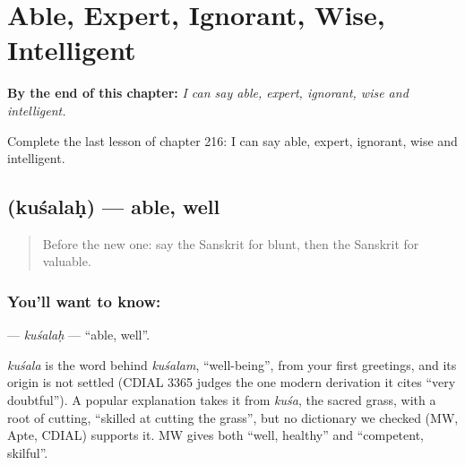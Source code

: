 
\chapter{Able, Expert, Ignorant, Wise, Intelligent}
\label{ch:sa-able-expert-ignorant-wise-intelligent}

\begin{chapteropening}
\textbf{By the end of this chapter:} \emph{I can say able, expert, ignorant, wise and intelligent.}

Complete the last lesson of chapter 216: I can say able, expert, ignorant, wise and intelligent.
\end{chapteropening}

\section[\texorpdfstring{\sk{कुशलः} (kuśalaḥ)}{कुशलः (kuśalaḥ)}]{ (kuśalaḥ) — able, well}

\label{lesson:SA-C216-kusalah}



\begin{quote}
Before the new one: say the Sanskrit for blunt, then the Sanskrit for valuable.
\end{quote}

\subsection*{You'll want to know: }
\textbf{} — \emph{kuśalaḥ} — \textquotedblleft{}able, well\textquotedblright{}.

\begin{cousinweb}
\emph{kuśala} is the word behind \emph{kuśalam}, \textquotedblleft{}well-being\textquotedblright{}, from your first greetings, and its origin is not settled (CDIAL 3365 judges the one modern derivation it cites \textquotedblleft{}very doubtful\textquotedblright{}). A popular explanation takes it from \emph{kuśa}, the sacred grass, with a root of cutting, \textquotedblleft{}skilled at cutting the grass\textquotedblright{}, but no dictionary we checked (MW, Apte, CDIAL) supports it. MW gives both \textquotedblleft{}well, healthy\textquotedblright{} and \textquotedblleft{}competent, skilful\textquotedblright{}.
\end{cousinweb}

